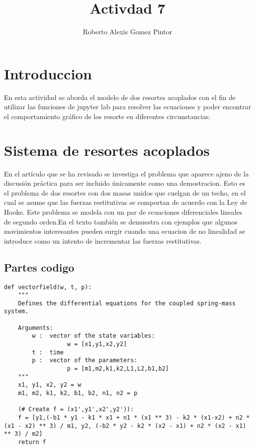 \documentclass{article}
\title{Activdad 7}
\author{Roberto Alexis Gomez Pintor}
\begin{document}
\maketitle
\section{Introduccion}
En esta actividad se aborda el modelo de dos resortes acoplados con el fin de
utilizar las funciones de jupyter lab para resolver las ecuaciones y poder encontrar el comportamiento gráfico de los resorte en diferentes circunstancias.
\section{Sistema de resortes acoplados}
En el artículo que se ha revisado se investiga el problema que aparece ajeno
de la discusión práctica para ser incluido únicamente como una demostracion. Esto es el problema de dos resortes con dos masas unidos que cuelgan de un techo, en el cual se asume que las fuerzas restitutivas se comportan de acuerdo con la Ley de Hooke. Este problema se modela con un par de ecuaciones diferenciales lineales de segundo orden.En el texto también se demuestra con ejemplos que algunos movimientos interesantes pueden surgir cuando una ecuacion de no linealidad se introduce como un intento de incrementar las fuerzas restitutivas.
\subsection{Partes codigo}
\begin{verbatim}
def vectorfield(w, t, p):
    """
    Defines the differential equations for the coupled spring-mass system.

    Arguments:
        w :  vector of the state variables:
                  w = [x1,y1,x2,y2]
        t :  time
        p :  vector of the parameters:
                  p = [m1,m2,k1,k2,L1,L2,b1,b2]
    """
    x1, y1, x2, y2 = w
    m1, m2, k1, k2, b1, b2, n1, n2 = p

    (# Create f = (x1',y1',x2',y2')):
    f = [y1,(-b1 * y1 - k1 * x1 + n1 * (x1 ** 3) - k2 * (x1-x2) + n2 * (x1 - x2) ** 3) / m1, y2, (-b2 * y2 - k2 * (x2 - x1) + n2 * (x2 - x1) ** 3) / m2]
    return f
\end{verbatim}
\end{document}
